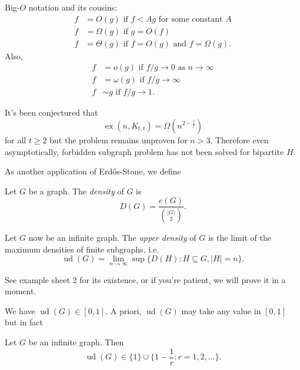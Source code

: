 \documentclass[a4paper]{article}
\DeclareMathOperator{\exx}{ex} %
\DeclareMathOperator{\ud}{ud} %
\begin{document}
\begin{notation}
  Big-\(O\) notation and its cousins:
\begin{align*}
  f &= O(g) \text{ if } f< Ag \text{ for some constant } A \\
  f &= \Omega(g) \text{ if } g=O(f) \\
  f &= \Theta(g) \text{ if } f= O(g) \text{ and } f = \Omega(g).
\end{align*}
Also,
\begin{align*}
  f &= o(g) \text{ if } f/g\to 0 \text{ as } n\to \infty \\
  f &= \omega(g) \text{ if } f/g\to \infty \\
  f &\sim g \text{ if } f/g\to 1.
\end{align*}
\end{notation}

It's been conjectured that
\[
  \exx(n, K_{t, t}) = \Omega(n^{2 - \frac{1}{t}})
\]
for all \(t \geq 2\) but the problem remains unproven for \(n > 3\). Therefore even asymptotically, forbidden subgraph problem has not been solved for bipartite \(H\).

As another application of Erdős-Stone, we define

\begin{definition}[density]
  Let \(G\) be a graph. The \emph{density} of \(G\) is
  \[
    D(G) = \frac{e(G)}{\binom{|G|}{2}}.
  \]
\end{definition}

\begin{definition}
  Let \(G\) now be an infinite graph. The \emph{upper density} of \(G\) is the limit of the maximum densities of finite subgraphs, i.e.\
  \[
    \ud(G) = \lim_{n \to \infty} \sup \{D(H): H \subseteq G, |H| = n\}.
  \]
\end{definition}

See example sheet 2 for its existence, or if you're patient, we will prove it in a moment.

We have \(\ud(G) \in [0, 1]\). A priori, \(\ud(G)\) may take any value in \([0, 1]\) but in fact

\begin{corollary}
  Let \(G\) be an infinite graph. Then
  \[
    \ud(G) \in \{1\} \cup \{1 - \frac{1}{r}: r = 1, 2, \dots\}.
  \]
\end{corollary}
\end{document}
